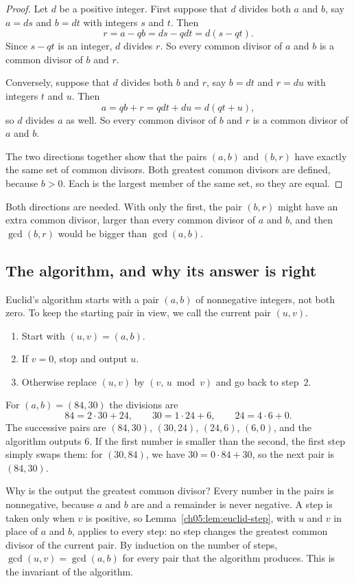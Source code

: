 \begin{proof}
Let $d$ be a positive integer. First suppose that $d$ divides both $a$ and $b$, say $a=ds$ and $b=dt$ with integers $s$ and $t$. Then
\[
 r=a-qb=ds-qdt=d(s-qt).
\]
Since $s-qt$ is an integer, $d$ divides $r$. So every common divisor of $a$ and $b$ is a common divisor of $b$ and $r$.

Conversely, suppose that $d$ divides both $b$ and $r$, say $b=dt$ and $r=du$ with integers $t$ and $u$. Then
\[
 a=qb+r=qdt+du=d(qt+u),
\]
so $d$ divides $a$ as well. So every common divisor of $b$ and $r$ is a common divisor of $a$ and $b$.

The two directions together show that the pairs $(a,b)$ and $(b,r)$ have exactly the same set of common divisors. Both greatest common divisors are defined, because $b>0$. Each is the largest member of the same set, so they are equal.
\end{proof}

Both directions are needed. With only the first, the pair $(b,r)$ might have an extra common divisor, larger than every common divisor of $a$ and $b$, and then $\gcd(b,r)$ would be bigger than $\gcd(a,b)$.

\subsection*{The algorithm, and why its answer is right}
Euclid's algorithm starts with a pair $(a,b)$ of nonnegative integers, not both zero. To keep the starting pair in view, we call the current pair $(u,v)$.
\begin{enumerate}
\item Start with $(u,v)=(a,b)$.
\item If $v=0$, stop and output $u$.
\item Otherwise replace $(u,v)$ by $(v,\,u\bmod v)$ and go back to step~2.
\end{enumerate}

For $(a,b)=(84,30)$ the divisions are
\[
84=2\cdot30+24,\qquad30=1\cdot24+6,\qquad24=4\cdot6+0.
\]
The successive pairs are $(84,30)$, $(30,24)$, $(24,6)$, $(6,0)$, and the algorithm outputs $6$. If the first number is smaller than the second, the first step simply swaps them: for $(30,84)$, we have $30=0\cdot84+30$, so the next pair is $(84,30)$.

Why is the output the greatest common divisor? Every number in the pairs is nonnegative, because $a$ and $b$ are and a remainder is never negative. A step is taken only when $v$ is positive, so Lemma~\ref{ch05:lem:euclid-step}, with $u$ and $v$ in place of $a$ and $b$, applies to every step: no step changes the greatest common divisor of the current pair. By induction on the number of steps, $\gcd(u,v)=\gcd(a,b)$ for every pair that the algorithm produces. This is the invariant of the algorithm.

